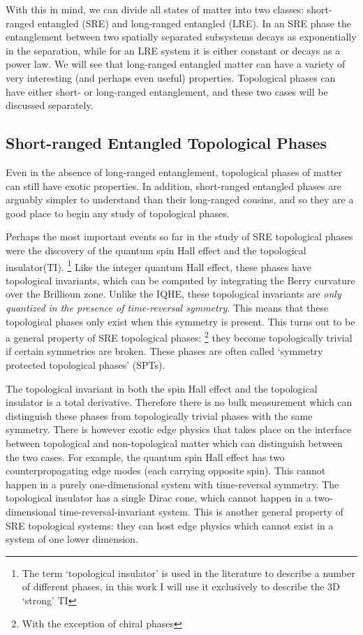 With this in mind, we can divide all states of matter into two classes: short-ranged entangled (SRE) and long-ranged entangled (LRE). 
In an SRE phase the entanglement between two spatially separated subsystems decays as exponentially in the separation, while for an LRE system it is either constant or decays as a power law. We will see that long-ranged entangled matter can have a variety of very interesting (and perhaps even useful) properties. Topological phases can have either short- or long-ranged entanglement, and these two cases will be discussed separately.

\subsection{Short-ranged Entangled Topological Phases}

Even in the absence of long-ranged entanglement, topological phases of matter can still have exotic properties. In addition, short-ranged entangled phases are arguably simpler to understand than their long-ranged cousins, and so they are a good place to begin any study of topological phases.

Perhaps the most important events so far in the study of SRE topological phases were the discovery of the quantum spin Hall effect\cite{QSHEreview} and the topological insulator(TI).\cite{KaneHasanRMP,QiZhangRMP}
\footnote{The term `topological insulator' is used in the literature to describe a number of different phases, in this work I will use it exclusively to describe the 3D `strong' TI}
Like the integer quantum Hall effect, these phases have topological invariants, which can be computed by integrating the Berry curvature over the Brillioun zone. Unlike the IQHE, these topological invariants are \emph{only quantized in the presence of time-reversal symmetry}. This means that these topological phases only exist when this symmetry is present. This turns out to be a general property of SRE topological phases:
\footnote{With the exception of chiral phases}
 they become topologically trivial if certain symmetries are broken. These phases are often called `symmetry protected topological phases' (SPTs).

The topological invariant in both the spin Hall effect and the topological insulator is a total derivative. Therefore 
there is no bulk measurement which can distinguish these phases from topologically trivial phases with the same symmetry. There is however exotic edge physics that takes place on the interface between topological and non-topological matter which can distinguish between the two cases. For example, the quantum spin Hall effect has two counterpropagating edge modes (each carrying opposite spin). This cannot happen in a purely one-dimensional system with time-reversal symmetry.\cite{NN} The topological insulator has a single Dirac cone, which cannot happen in a two-dimensional time-reversal-invariant system. This is another general property of SRE topological systems: they can host edge physics which cannot exist in a system of one lower dimension.

